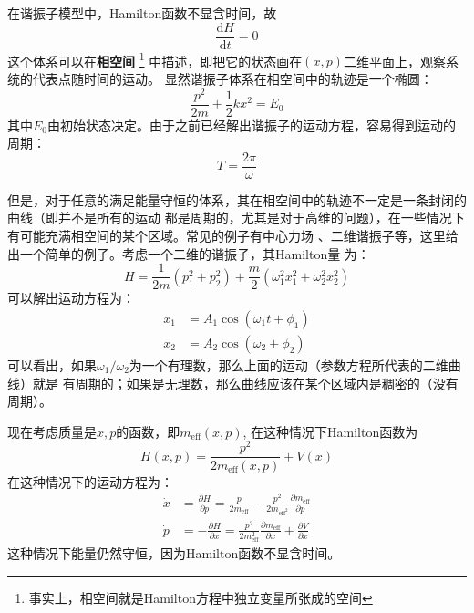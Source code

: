     \par 
    在谐振子模型中，Hamilton函数不显含时间，故
    \begin{equation}
        \frac {\mathrm{d}H}{\mathrm{d}t} = 0
    \end{equation}
    这个体系可以在\textbf{相空间}
    \footnote{事实上，相空间就是Hamilton方程中独立变量所张成的空间}
    中描述，即把它的状态画在$(x,p)$二维平面上，观察系统的代表点随时间的运动。
    显然谐振子体系在相空间中的轨迹是一个椭圆：
    \begin{equation}
        \frac{p^2}{2m} + \frac 12 kx^2 = E_0
    \end{equation}
    其中$E_0$由初始状态决定。由于之前已经解出谐振子的运动方程，容易得到运动的周期：
    \begin{equation}
        T = \frac{2\pi}{\omega}
    \end{equation}
    \par 
    但是，对于任意的满足能量守恒的体系，其在相空间中的轨迹不一定是一条封闭的曲线（即并不是所有的运动
    都是周期的，尤其是对于高维的问题），在一些情况下有可能充满相空间的某个区域。常见的例子有中心力场
    \cite{Landau2007mechanics}、二维谐振子等\cite{B2006经典力学的数学方法}，这里给出一个简单的例子。考虑一个二维的谐振子，其Hamilton量
    为：
    \begin{equation}
        H = \frac{1}{2m}(p_1^2 + p_2^2) + \frac{m}{2}(\omega_1^2x_1^2 + \omega_2^2x_2^2)
    \end{equation}
    可以解出运动方程为：
    \begin{equation}
        \begin{split}
            x_1 &= A_1\cos(\omega_1 t + \phi_1)\\
            x_2 &= A_2\cos(\omega_2 + \phi_2)
        \end{split}
    \end{equation}
    可以看出，如果$\omega_1 / \omega_2$为一个有理数，那么上面的运动（参数方程所代表的二维曲线）就是
    有周期的；如果是无理数，那么曲线应该在某个区域内是稠密的（没有周期）。
    \par
    现在考虑质量是$x,p$的函数，即$m_\mathrm{eff}(x,p)$, 在这种情况下Hamilton函数为
    \begin{equation}
        H(x,p) = \frac {p^2}{2m_\mathrm{eff}(x,p)} + V(x)
    \end{equation}
    在这种情况下的运动方程为：
    \begin{equation}
        \begin{split}
            \dot{x} &= \frac {\partial H}{\partial p} = \frac {p}{2m_{\mathrm{eff}}} - \frac {p^2}{2m_{\mathrm{eff}^2}} \frac {\partial m_\mathrm{eff}}{\partial p} \\
            \dot{p} &= -\frac {\partial H}{\partial x} = \frac {p^2}{2m_\mathrm{eff}^2} \frac {\partial m_\mathrm{eff}}{\partial x} + \frac {\partial V}{\partial x}
        \end{split}
    \end{equation}
    这种情况下能量仍然守恒，因为Hamilton函数不显含时间。
